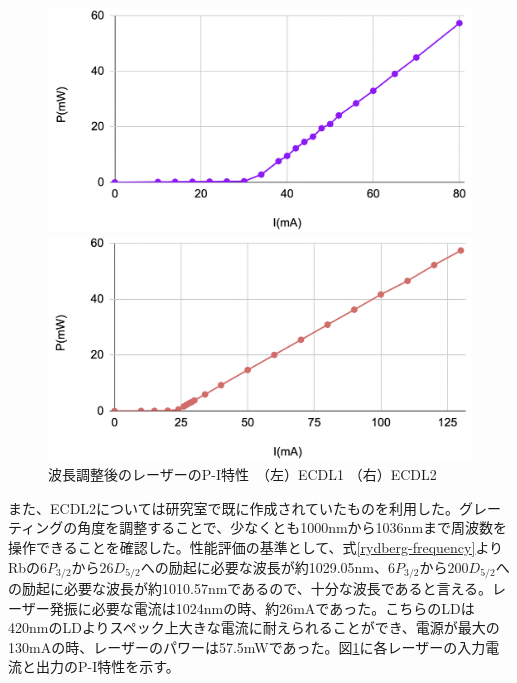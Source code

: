 \documentclass[dvipdfmx]{jsreport}
\begin{document}
\begin{figure}[hbtp]
\centering
\begin{minipage}[b]{0.45\linewidth}
\includegraphics[width=1\textwidth]{images/420-P-I.png}
\end{minipage}
\begin{minipage}[b]{0.45\linewidth}
\includegraphics[width=1\textwidth]{images/1024-P-I.png}
\end{minipage}
\caption{\label{fig:p-i}波長調整後のレーザーのP-I特性　（左）ECDL1 （右）ECDL2}
\end{figure}
また、ECDL2については研究室で既に作成されていたものを利用した。グレーティングの角度を調整することで、少なくとも1000nmから1036nmまで周波数を操作できることを確認した。性能評価の基準として、式\ref{rydberg-frequency}よりRbの$6P_{3/2}$から$26D_{5/2}$への励起に必要な波長が約1029.05nm、$6P_{3/2}$から$200D_{5/2}$への励起に必要な波長が約1010.57nmであるので、十分な波長であると言える。レーザー発振に必要な電流は1024nmの時、約26mAであった。こちらのLDは420nmのLDよりスペック上大きな電流に耐えられることができ、電源が最大の130mAの時、レーザーのパワーは57.5mWであった。図\ref{fig:p-i}に各レーザーの入力電流と出力のP-I特性を示す。
\end{document}
